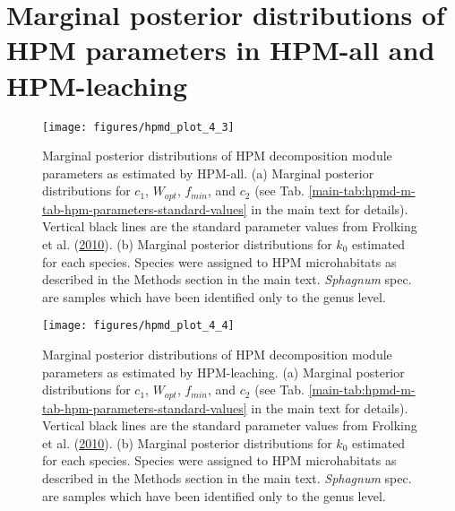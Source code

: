 \documentclass[
  12pt,
]{article}
\begin{document}
\hypertarget{sup-5}{%
\section{Marginal posterior distributions of HPM parameters in HPM-all and HPM-leaching}\label{sup-5}}



\begin{figure}[H]

{\centering \texttt{[image: figures/hpmd\_plot\_4\_3]} 

}

\caption{Marginal posterior distributions of HPM decomposition module parameters as estimated by HPM-all. (a) Marginal posterior distributions for \(c_1\), \(W_{opt}\), \(f_{min}\), and \(c_2\) (see Tab. \ref{main-tab:hpmd-m-tab-hpm-parameters-standard-values} in the main text for details). Vertical black lines are the standard parameter values from Frolking et al. (\protect\hyperlink{ref-Frolking.2010}{2010}). (b) Marginal posterior distributions for \(k_0\) estimated for each species. Species were assigned to HPM microhabitats as described in the Methods section in the main text. \emph{Sphagnum} spec. are samples which have been identified only to the genus level.}\label{fig:sup-hpmd-plot-4-3}
\end{figure}



\begin{figure}[H]

{\centering \texttt{[image: figures/hpmd\_plot\_4\_4]} 

}

\caption{Marginal posterior distributions of HPM decomposition module parameters as estimated by HPM-leaching. (a) Marginal posterior distributions for \(c_1\), \(W_{opt}\), \(f_{min}\), and \(c_2\) (see Tab. \ref{main-tab:hpmd-m-tab-hpm-parameters-standard-values} in the main text for details). Vertical black lines are the standard parameter values from Frolking et al. (\protect\hyperlink{ref-Frolking.2010}{2010}). (b) Marginal posterior distributions for \(k_0\) estimated for each species. Species were assigned to HPM microhabitats as described in the Methods section in the main text. \emph{Sphagnum} spec. are samples which have been identified only to the genus level.}\label{fig:sup-hpmd-plot-4-4}
\end{figure}
\end{document}
